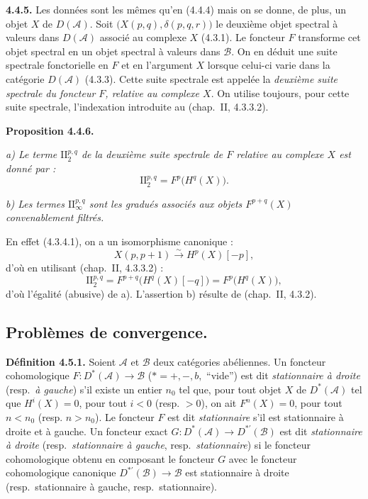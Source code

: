 \clearpage
{}%
\begingroup\small\setlength{\parskip}{0pt}\setlength{\emergencystretch}{1.5em}
\setlength{\abovedisplayskip}{4pt plus 2pt minus 2pt}%
\setlength{\belowdisplayskip}{4pt plus 2pt minus 2pt}%

\noindent\textbf{4.4.5.}\quad
Les données sont les mêmes qu'en (4.4.4) mais on se donne, de plus, un
objet $X$ de $D(\mathcal A)$. Soit
$\bigl(X(p,q),\delta(p,q,r)\bigr)$ le deuxième objet spectral à valeurs
dans $D(\mathcal A)$ associé au complexe $X$ (4.3.1). Le foncteur $F$
transforme cet objet spectral en un objet spectral à valeurs dans
$\mathcal B$. On en déduit une suite spectrale fonctorielle en $F$ et en
l'argument $X$ lorsque celui-ci varie dans la catégorie $D(\mathcal A)$
(4.3.3). Cette suite spectrale est appelée la \emph{deuxième suite
spectrale du foncteur $F$, relative au complexe $X$}. On utilise toujours,
pour cette suite spectrale, l'indexation introduite au (chap.~II, 4.3.3.2).

\medskip\noindent\textbf{Proposition 4.4.6.}\quad

\noindent\textit{a) Le terme $\mathrm{II}_2^{p,q}$ de la deuxième suite
spectrale de $F$ relative au complexe $X$ est donné par :}
\[
\mathrm{II}_2^{p,q}=F^p\bigl(H^q(X)\bigr).
\]

\noindent\textit{b) Les termes $\mathrm{II}_{\infty}^{p,q}$ sont les
gradués associés aux objets $F^{p+q}(X)$ convenablement filtrés.}

En effet (4.3.4.1), on a un isomorphisme canonique :
\[
X(p,p+1)\xrightarrow{\sim}H^p(X)[-p],
\]
d'où en utilisant (chap.~II, 4.3.3.2) :
\[
\mathrm{II}_2^{p,q}
=F^{p+q}\bigl(H^q(X)[-q]\bigr)
=F^p\bigl(H^q(X)\bigr),
\]
d'où l'égalité (abusive) de a). L'assertion b) résulte de
(chap.~II, 4.3.2).

\subsection{Problèmes de convergence.}

\noindent\textbf{Définition 4.5.1.}\quad
Soient $\mathcal A$ et $\mathcal B$ deux catégories abéliennes. Un foncteur
cohomologique $F\colon D^*(\mathcal A)\longrightarrow\mathcal B$
($*=+,-,b,{}$ ``vide'') est dit \emph{stationnaire à droite} (resp.\
\emph{à gauche}) s'il existe un entier $n_0$ tel que, pour tout objet $X$
de $D^*(\mathcal A)$ tel que $H^i(X)=0$, pour tout $i<0$ (resp. $>0$), on
ait $F^n(X)=0$, pour tout $n<n_0$ (resp. $n>n_0$). Le foncteur $F$ est dit
\emph{stationnaire} s'il est stationnaire à droite et à gauche. Un foncteur
exact $G\colon D^*(\mathcal A)\longrightarrow D^{*'}(\mathcal B)$ est dit
\emph{stationnaire à droite} (resp.\ \emph{stationnaire à gauche}, resp.\
\emph{stationnaire}) si le foncteur cohomologique obtenu en composant le
foncteur $G$ avec le foncteur cohomologique canonique
$D^{*'}(\mathcal B)\longrightarrow\mathcal B$ est stationnaire à droite
(resp.\ stationnaire à gauche, resp.\ stationnaire).
\endgroup
